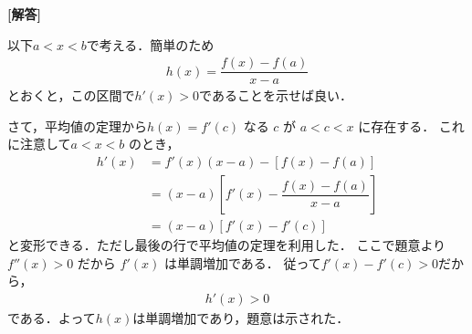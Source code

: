 \documentclass[../../main.tex]{subfiles}
\begin{document}
\begin{oframed}
  
\end{oframed}

{\bf [解答]}

以下$a<x<b$で考える．簡単のため
\begin{align}
  h(x) = \dfrac{f(x) - f(a)}{x - a}
\end{align}
とおくと，この区間で$h'(x)>0$であることを示せば良い．

さて，平均値の定理から$h(x) = f'(c)$ なる $c$ が $a < c < x$ に存在する．
これに注意して$a < x < b$ のとき，
\begin{align}
  h'(x)
  &= f'(x)(x-a) - \left[f(x) - f(a)\right] \\
  &= \left(x-a\right) \left[f'(x)-\dfrac{f(x) - f(a)}{x - a}\right] \\
  &= \left(x-a\right) \left[f'(x)-f'(c)\right]
\end{align}
と変形できる．ただし最後の行で平均値の定理を利用した．
ここで題意より$f''(x) > 0$ だから $f'(x)$ は単調増加である．
従って$f'(x)-f'(c)>0$だから，
\begin{align}
  h'(x)>0
\end{align}
である．よって$h(x)$は単調増加であり，題意は示された．
\end{document}
